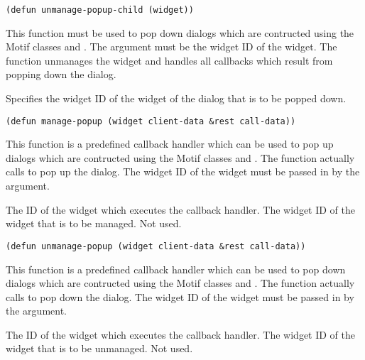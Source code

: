 \begin{lispd}
\syntax\begin{verbatim}
(defun unmanage-popup-child (widget))
\end{verbatim}
\beschr This function must be used to pop down dialogs which are contructed
using the Motif classes  and .  The
 argument must be the widget ID of the 
widget.  The function unmanages the  widget and handles
all callbacks which result from popping down the dialog. 
\parameter
\begin{paramd}
 Specifies the widget ID of the  widget
of the dialog that is to be popped down.
\end{paramd}
\end{lispd}

\begin{lispd}
\syntax\begin{verbatim}
(defun manage-popup (widget client-data &rest call-data))
\end{verbatim}
\beschr This function is a predefined callback handler which can be used to
pop up dialogs which are contructed using the Motif classes 
 and . The function actually calls
 to pop up the dialog. The widget ID of the
 widget must be passed in by the 
argument.
\parameter
\begin{paramd}
 The ID of the widget which executes the callback handler.
 The widget ID of the  widget that
is to be managed.
 Not used.
\end{paramd}
\end{lispd}

\begin{lispd}
\syntax\begin{verbatim}
(defun unmanage-popup (widget client-data &rest call-data))
\end{verbatim}
\beschr This function is a predefined callback handler which can be used to
pop down dialogs which are contructed using the Motif classes 
 and . The function actually calls
 to pop down the dialog. The widget ID of the
 widget must be passed in by the 
argument.
\parameter
\begin{paramd}
 The ID of the widget which executes the callback handler.
 The widget ID of the  widget that
is to be unmanaged.
 Not used.
\end{paramd}
\end{lispd}

